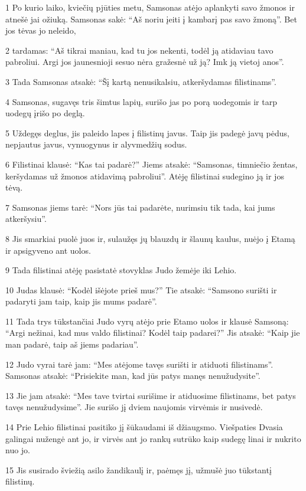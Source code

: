 \par 1 Po kurio laiko, kviečių pjūties metu, Samsonas atėjo aplankyti savo žmonos ir atnešė jai ožiuką. Samsonas sakė: “Aš noriu įeiti į kambarį pas savo žmoną”. Bet jos tėvas jo neleido, 
\par 2 tardamas: “Aš tikrai maniau, kad tu jos nekenti, todėl ją atidaviau tavo pabroliui. Argi jos jaunesnioji sesuo nėra gražesnė už ją? Imk ją vietoj anos”. 
\par 3 Tada Samsonas atsakė: “Šį kartą nenusikalsiu, atkeršydamas filistinams”. 
\par 4 Samsonas, sugavęs tris šimtus lapių, surišo jas po porą uodegomis ir tarp uodegų įrišo po deglą. 
\par 5 Uždegęs deglus, jis paleido lapes į filistinų javus. Taip jis padegė javų pėdus, nepjautus javus, vynuogynus ir alyvmedžių sodus. 
\par 6 Filistinai klausė: “Kas tai padarė?” Jiems atsakė: “Samsonas, timniečio žentas, keršydamas už žmonos atidavimą pabroliui”. Atėję filistinai sudegino ją ir jos tėvą. 
\par 7 Samsonas jiems tarė: “Nors jūs tai padarėte, nurimsiu tik tada, kai jums atkeršysiu”. 
\par 8 Jis smarkiai puolė juos ir, sulaužęs jų blauzdų ir šlaunų kaulus, nuėjo į Etamą ir apsigyveno ant uolos. 
\par 9 Tada filistinai atėję pasistatė stovyklas Judo žemėje iki Lehio. 
\par 10 Judas klausė: “Kodėl išėjote prieš mus?” Tie atsakė: “Samsono surišti ir padaryti jam taip, kaip jis mums padarė”. 
\par 11 Tada trys tūkstančiai Judo vyrų atėjo prie Etamo uolos ir klausė Samsoną: “Argi nežinai, kad mus valdo filistinai? Kodėl taip padarei?” Jis atsakė: “Kaip jie man padarė, taip aš jiems padariau”. 
\par 12 Judo vyrai tarė jam: “Mes atėjome tavęs surišti ir atiduoti filistinams”. Samsonas atsakė: “Prisiekite man, kad jūs patys manęs nenužudysite”. 
\par 13 Jie jam atsakė: “Mes tave tvirtai surišime ir atiduosime filistinams, bet patys tavęs nenužudysime”. Jie surišo jį dviem naujomis virvėmis ir nusivedė. 
\par 14 Prie Lehio filistinai pasitiko jį šūkaudami iš džiaugsmo. Viešpaties Dvasia galingai nužengė ant jo, ir virvės ant jo rankų sutrūko kaip sudegę linai ir nukrito nuo jo. 
\par 15 Jis susirado šviežią asilo žandikaulį ir, paėmęs jį, užmušė juo tūkstantį filistinų. 
